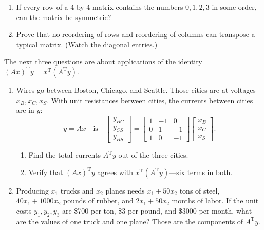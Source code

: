 \documentclass[14pt, a4paper]{article}
\begin{document}
\begin{enumerate}[resume]
    \item If every row of a 4 by 4 matrix contains the numbers $0,1,2,3$ in some order, can the matrix be symmetric?

    \item Prove that no reordering of rows and reordering of columns can transpose a typical matrix. (Watch the diagonal entries.)
\end{enumerate}

\noindent The next three questions are about applications of the identity $(Ax)^{\mathrm{T}}y = x^{\mathrm{T}}(A^{\mathrm{T}}y)$.
\begin{enumerate}[resume]
    \item Wires go between Boston, Chicago, and Seattle. Those cities are at voltages $x_B,x_C,x_S$. With unit resistances between cities, the currents between cities are in $y$:
          \[
              y = Ax \quad\text{is}\quad
              \begin{bmatrix}y_{BC}\\ y_{CS}\\ y_{BS}\end{bmatrix}
              =
              \begin{bmatrix}
                  1 & -1 & 0  \\
                  0 & 1  & -1 \\
                  1 & 0  & -1
              \end{bmatrix}
              \begin{bmatrix}x_B\\ x_C\\ x_S\end{bmatrix}.
          \]
          \begin{enumerate}
              \item Find the total currents $A^{\mathrm{T}}y$ out of the three cities.
              \item Verify that $(Ax)^{\mathrm{T}}y$ agrees with $x^{\mathrm{T}}(A^{\mathrm{T}}y)$---six terms in both.
          \end{enumerate}

    \item Producing $x_1$ trucks and $x_2$ planes needs $x_1 + 50x_2$ tons of steel, $40x_1 + 1000x_2$ pounds of rubber, and $2x_1 + 50x_2$ months of labor. If the unit costs $y_1,y_2,y_3$ are \$700 per ton, \$3 per pound, and \$3000 per month, what are the values of one truck and one plane? Those are the components of $A^{\mathrm{T}}y$.


\end{enumerate}
\end{document}

